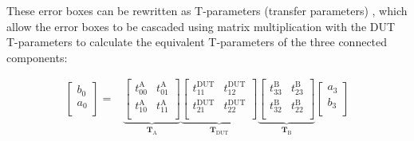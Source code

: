 \documentclass[../thesis/thesis.tex]{subfiles}
\begin{document}
These error boxes can be rewritten as T-parameters (transfer parameters) \cite[pp.12--14]{Egan_2004}, which allow the error boxes to be cascaded using matrix multiplication with the DUT T-parameters to calculate the equivalent T-parameters of the three connected components:

\begin{align}
\begin{bmatrix}
b_0 \\
a_0 \\
\end{bmatrix}
=
&\underbrace{
	\begin{bmatrix}
	t^\textrm{A}_{00} & t^\textrm{A}_{01} \\
	t^\textrm{A}_{10} & t^\textrm{A}_{11} \\
	\end{bmatrix}
}_{\mathbf{T}_\textrm{A}}
\underbrace{
	\begin{bmatrix}
	t^\textrm{DUT}_{11} & t^\textrm{DUT}_{12} \\
	t^\textrm{DUT}_{21} & t^\textrm{DUT}_{22} \\
	\end{bmatrix}
}_{\mathbf{T}_\textrm{DUT}}
\underbrace{
	\begin{bmatrix}
	t^\textrm{B}_{33} & t^\textrm{B}_{23} \\
	t^\textrm{B}_{32} & t^\textrm{B}_{22} \\
	\end{bmatrix}
}_{\mathbf{T}_\textrm{B}}
\begin{bmatrix}
a_3 \\
b_3 \\
\end{bmatrix}
\end{align}
\end{document}
